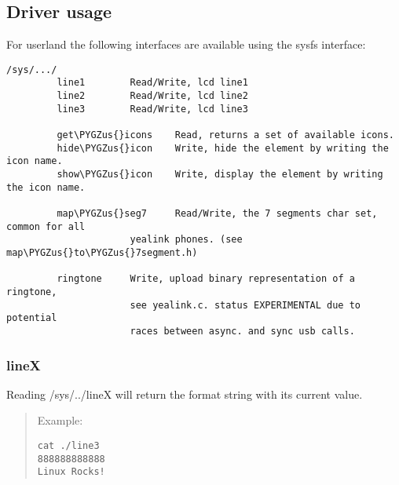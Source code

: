\documentclass[a4paper,8pt,english]{sphinxmanual}
\def\PYGZus{\char`\_}
\begin{document}
\subsection{Driver usage}
\label{input/devices/yealink:driver-usage}
For userland the following interfaces are available using the sysfs interface:

\begin{Verbatim}[commandchars=\\\{\}]
/sys/.../
         line1        Read/Write, lcd line1
         line2        Read/Write, lcd line2
         line3        Read/Write, lcd line3

         get\PYGZus{}icons    Read, returns a set of available icons.
         hide\PYGZus{}icon    Write, hide the element by writing the icon name.
         show\PYGZus{}icon    Write, display the element by writing the icon name.

         map\PYGZus{}seg7     Read/Write, the 7 segments char set, common for all
                      yealink phones. (see map\PYGZus{}to\PYGZus{}7segment.h)

         ringtone     Write, upload binary representation of a ringtone,
                      see yealink.c. status EXPERIMENTAL due to potential
                      races between async. and sync usb calls.
\end{Verbatim}


\subsubsection{lineX}
\label{input/devices/yealink:linex}
Reading /sys/../lineX will return the format string with its current value.
\begin{quote}

Example:

\begin{Verbatim}[commandchars=\\\{\}]
cat ./line3
888888888888
Linux Rocks!
\end{Verbatim}
\end{quote}
\end{document}
